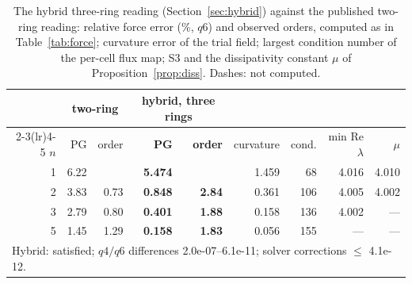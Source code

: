 \begin{table}[t]\centering\small
\caption{The hybrid three-ring reading (Section~\ref{sec:hybrid}) against the published two-ring reading: relative force error (\%, $q6$) and observed orders, computed as in Table~\ref{tab:force}; curvature error of the trial field; largest condition number of the per-cell flux map; S3 and the dissipativity constant $\mu$ of Proposition~\ref{prop:diss}. Dashes: not computed.}
\label{tab:hybrid}
\begin{tabular}{rrrrrrrrr}\toprule
 & \multicolumn{2}{c}{two-ring} & \multicolumn{2}{c}{\textbf{hybrid, three rings}} & & & & \\
\cmidrule(lr){2-3}\cmidrule(lr){4-5}
$n$ & PG & order & \textbf{PG} & \textbf{order} & curvature & cond. & min Re $\lambda$ & $\mu$ \\ \midrule
1 & 6.22 &  & \textbf{5.474} &  & 1.459 & 68 & 4.016 & 4.010 \\
2 & 3.83 & 0.73 & \textbf{0.848} & \textbf{2.84} & 0.361 & 106 & 4.005 & 4.002 \\
3 & 2.79 & 0.80 & \textbf{0.401} & \textbf{1.88} & 0.158 & 136 & 4.002 & --- \\
5 & 1.45 & 1.29 & \textbf{0.158} & \textbf{1.83} & 0.056 & 155 & --- & --- \\
\midrule
\multicolumn{9}{l}{Hybrid: \BW{} satisfied; $q4/q6$ differences 2.0e-07--6.1e-11; solver corrections $\le$ 4.1e-12.}\\
\bottomrule\end{tabular}\end{table}
